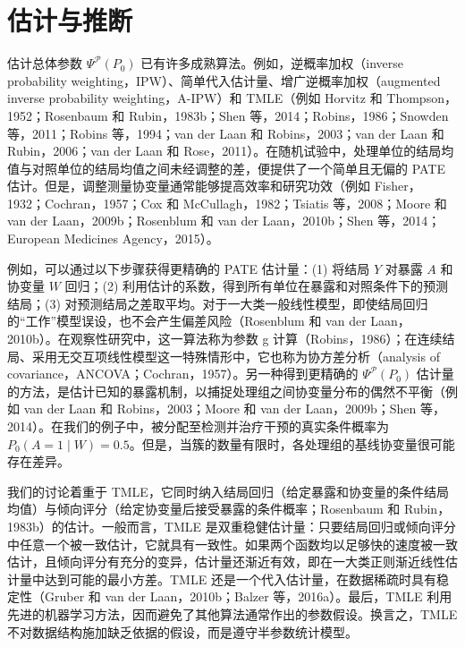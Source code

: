 \section{估计与推断}

估计总体参数 $\Psi^{\mathcal P}(P_0)$ 已有许多成熟算法。例如，逆概率加权（inverse probability weighting，IPW）、简单代入估计量、增广逆概率加权（augmented inverse probability weighting，A-IPW）和 TMLE（例如 Horvitz 和 Thompson，1952；Rosenbaum 和 Rubin，1983b；Shen 等，2014；Robins，1986；Snowden 等，2011；Robins 等，1994；van der Laan 和 Robins，2003；van der Laan 和 Rubin，2006；van der Laan 和 Rose，2011）。在随机试验中，处理单位的结局均值与对照单位的结局均值之间未经调整的差，便提供了一个简单且无偏的 PATE 估计。但是，调整测量协变量通常能够提高效率和研究功效（例如 Fisher，1932；Cochran，1957；Cox 和 McCullagh，1982；Tsiatis 等，2008；Moore 和 van der Laan，2009b；Rosenblum 和 van der Laan，2010b；Shen 等，2014；European Medicines Agency，2015）。

例如，可以通过以下步骤获得更精确的 PATE 估计量：(1) 将结局 $Y$ 对暴露 $A$ 和协变量 $W$ 回归；(2) 利用估计的系数，得到所有单位在暴露和对照条件下的预测结局；(3) 对预测结局之差取平均。对于一大类一般线性模型，即使结局回归的“工作”模型误设，也不会产生偏差风险（Rosenblum 和 van der Laan，2010b）。在观察性研究中，这一算法称为参数 g 计算（Robins，1986）；在连续结局、采用无交互项线性模型这一特殊情形中，它也称为协方差分析（analysis of covariance，ANCOVA；Cochran，1957）。另一种得到更精确的 $\Psi^{\mathcal P}(P_0)$ 估计量的方法，是估计已知的暴露机制，以捕捉处理组之间协变量分布的偶然不平衡（例如 van der Laan 和 Robins，2003；Moore 和 van der Laan，2009b；Shen 等，2014）。在我们的例子中，被分配至检测并治疗干预的真实条件概率为 $P_0(A=1\mid W)=0.5$。但是，当簇的数量有限时，各处理组的基线协变量很可能存在差异。

我们的讨论着重于 TMLE，它同时纳入结局回归（给定暴露和协变量的条件结局均值）与倾向评分（给定协变量后接受暴露的条件概率；Rosenbaum 和 Rubin，1983b）的估计。一般而言，TMLE 是双重稳健估计量：只要结局回归或倾向评分中任意一个被一致估计，它就具有一致性。如果两个函数均以足够快的速度被一致估计，且倾向评分有充分的变异，估计量还渐近有效，即在一大类正则渐近线性估计量中达到可能的最小方差。TMLE 还是一个代入估计量，在数据稀疏时具有稳定性（Gruber 和 van der Laan，2010b；Balzer 等，2016a）。最后，TMLE 利用先进的机器学习方法，因而避免了其他算法通常作出的参数假设。换言之，TMLE 不对数据结构施加缺乏依据的假设，而是遵守半参数统计模型。
